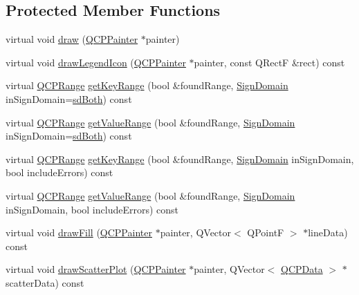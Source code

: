 \subsection*{Protected Member Functions}
\begin{DoxyCompactItemize}
\item 
virtual void \hyperlink{class_q_c_p_graph_a659218cc62c2a7786213d9dd429c1c8d}{draw} (\hyperlink{class_q_c_p_painter}{Q\+C\+P\+Painter} $\ast$painter)
\item 
virtual void \hyperlink{class_q_c_p_graph_a32115df0e940cf8ca7b687873c2d02ee}{draw\+Legend\+Icon} (\hyperlink{class_q_c_p_painter}{Q\+C\+P\+Painter} $\ast$painter, const Q\+Rect\+F \&rect) const 
\item 
virtual \hyperlink{class_q_c_p_range}{Q\+C\+P\+Range} \hyperlink{class_q_c_p_graph_afc246ce6201ff564ac440efaec52ab11}{get\+Key\+Range} (bool \&found\+Range, \hyperlink{class_q_c_p_abstract_plottable_a661743478a1d3c09d28ec2711d7653d8}{Sign\+Domain} in\+Sign\+Domain=\hyperlink{class_q_c_p_abstract_plottable_a661743478a1d3c09d28ec2711d7653d8a082b98cfb91a7363a3b5cd17b0c1cd60}{sd\+Both}) const 
\item 
virtual \hyperlink{class_q_c_p_range}{Q\+C\+P\+Range} \hyperlink{class_q_c_p_graph_a856e90b8ab6b31c344b14a863ab9e5d2}{get\+Value\+Range} (bool \&found\+Range, \hyperlink{class_q_c_p_abstract_plottable_a661743478a1d3c09d28ec2711d7653d8}{Sign\+Domain} in\+Sign\+Domain=\hyperlink{class_q_c_p_abstract_plottable_a661743478a1d3c09d28ec2711d7653d8a082b98cfb91a7363a3b5cd17b0c1cd60}{sd\+Both}) const 
\item 
virtual \hyperlink{class_q_c_p_range}{Q\+C\+P\+Range} \hyperlink{class_q_c_p_graph_aa75c6f028124032416a5cf7145dfba60}{get\+Key\+Range} (bool \&found\+Range, \hyperlink{class_q_c_p_abstract_plottable_a661743478a1d3c09d28ec2711d7653d8}{Sign\+Domain} in\+Sign\+Domain, bool include\+Errors) const 
\item 
virtual \hyperlink{class_q_c_p_range}{Q\+C\+P\+Range} \hyperlink{class_q_c_p_graph_ab964a21d680af93435d68126d8c5ab29}{get\+Value\+Range} (bool \&found\+Range, \hyperlink{class_q_c_p_abstract_plottable_a661743478a1d3c09d28ec2711d7653d8}{Sign\+Domain} in\+Sign\+Domain, bool include\+Errors) const 
\item 
virtual void \hyperlink{class_q_c_p_graph_ad6d07926e6d6b7cfa70258780d47b7a0}{draw\+Fill} (\hyperlink{class_q_c_p_painter}{Q\+C\+P\+Painter} $\ast$painter, Q\+Vector$<$ Q\+Point\+F $>$ $\ast$line\+Data) const 
\item 
virtual void \hyperlink{class_q_c_p_graph_a6bdc385b122ce06134d4196373ae2250}{draw\+Scatter\+Plot} (\hyperlink{class_q_c_p_painter}{Q\+C\+P\+Painter} $\ast$painter, Q\+Vector$<$ \hyperlink{class_q_c_p_data}{Q\+C\+P\+Data} $>$ $\ast$scatter\+Data) const 

\end{DoxyCompactItemize}
